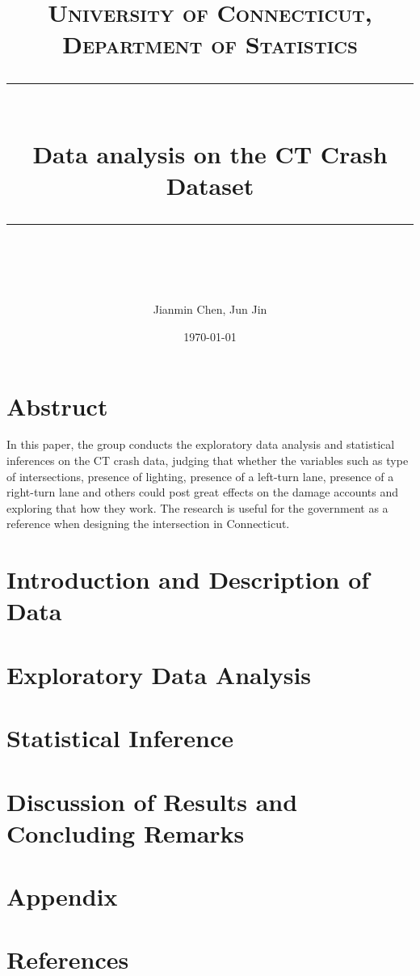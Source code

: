 \documentclass[11pt]{scrartcl} %
\title{	
	\normalfont\normalsize
	\textsc{University of Connecticut, Department of Statistics}\\ %
	\vspace{25pt} %
	\rule{\linewidth}{0.5pt}\\ %
	\vspace{20pt} %
	{\huge Data analysis on the CT Crash Dataset}\\ %
	\vspace{12pt} %
	\rule{\linewidth}{2pt}\\ %
	\vspace{12pt} %
}
\author{\LARGE Jianmin Chen, Jun Jin} %
\date{\normalsize\today} %
\begin{document}
\maketitle %


\tableofcontents


\section{Abstruct}

In this paper, the group conducts the exploratory data analysis and statistical inferences on the CT crash data, judging that whether the variables such as type of intersections, presence of lighting, presence of a left-turn lane, presence of a right-turn lane and others could post great effects on the damage accounts and exploring that how they work. The research is useful for the government as a reference when designing the intersection in Connecticut.


\section{Introduction and Description of Data}




\section{Exploratory Data Analysis}


\section{Statistical Inference}


\section{Discussion of Results and Concluding Remarks}


\section{Appendix}


\section{References}
\end{document}
